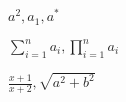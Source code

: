 $a^2, a_1, a^{*}$ 

$\sum_{i=1}^n a_i, \prod_{i=1}^n a_i$ 

$\frac{x + 1}{x + 2}, \sqrt{a^2 + b^2}$ 
